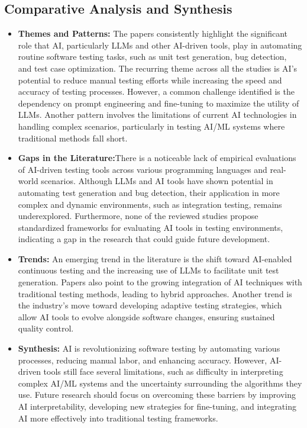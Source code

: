 \documentclass[12pt,a4paper]{article}
\begin{document}
\newpage
\subsection{Comparative Analysis and Synthesis}
\begin{itemize}
    \item \textbf{Themes and Patterns:}  The papers consistently highlight the significant role that AI, particularly LLMs and other AI-driven tools, play in automating routine software testing tasks, such as unit test generation, bug detection, and test case optimization. The recurring theme across all the studies is AI's potential to reduce manual testing efforts while increasing the speed and accuracy of testing processes. However, a common challenge identified is the dependency on prompt engineering and fine-tuning to maximize the utility of LLMs. Another pattern involves the limitations of current AI technologies in handling complex scenarios, particularly in testing AI/ML systems where traditional methods fall short.
    
    \item \textbf{Gaps in the Literature:}There is a noticeable lack of empirical evaluations of AI-driven testing tools across various programming languages and real-world scenarios. Although LLMs and AI tools have shown potential in automating test generation and bug detection, their application in more complex and dynamic environments, such as integration testing, remains underexplored. Furthermore, none of the reviewed studies propose standardized frameworks for evaluating AI tools in testing environments, indicating a gap in the research that could guide future development.

    \item \textbf{Trends:} An emerging trend in the literature is the shift toward AI-enabled continuous testing and the increasing use of LLMs to facilitate unit test generation. Papers also point to the growing integration of AI techniques with traditional testing methods, leading to hybrid approaches. Another trend is the industry’s move toward developing adaptive testing strategies, which allow AI tools to evolve alongside software changes, ensuring sustained quality control.
    
    \item \textbf{Synthesis:} AI is revolutionizing software testing by automating various processes, reducing manual labor, and enhancing accuracy. However, AI-driven tools still face several limitations, such as difficulty in interpreting complex AI/ML systems and the uncertainty surrounding the algorithms they use. Future research should focus on overcoming these barriers by improving AI interpretability, developing new strategies for fine-tuning, and integrating AI more effectively into traditional testing frameworks.


\end{itemize}
\end{document}
